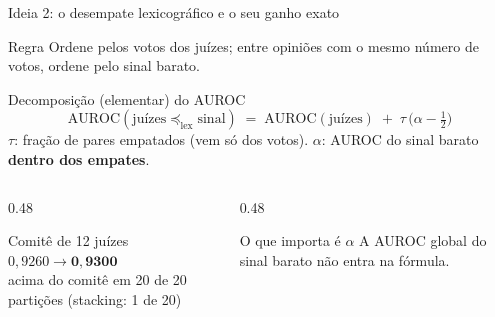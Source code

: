 \documentclass[aspectratio=169,11pt]{beamer}
\newcommand{\AUC}{\mathrm{AUROC}}
\newcommand{\lex}{\preceq_{\mathrm{lex}}}
\begin{document}
\begin{frame}{Ideia 2: o desempate lexicográfico e o seu ganho exato}
  \begin{block}{Regra}
    Ordene pelos votos dos juízes; entre opiniões com o mesmo número de votos, ordene pelo sinal barato.
  \end{block}
  \vspace{0.2cm}
  \begin{exampleblock}{Decomposição (elementar) do AUROC}
    $$\AUC(\text{juízes} \lex \text{sinal}) \;=\; \AUC(\text{juízes}) \;+\; \tau\,\Big(\alpha - \tfrac{1}{2}\Big)$$
    \small $\tau$: fração de pares empatados (vem só dos votos). \quad
    $\alpha$: AUROC do sinal barato \textbf{dentro dos empates}.
  \end{exampleblock}
  \vspace{0.2cm}
  \begin{columns}[T]
    \begin{column}{0.48\textwidth}
      \begin{block}{\centering Comitê de 12 juízes}\centering
        $0{,}9260 \to \mathbf{0{,}9300}$\\ \small acima do comitê em 20 de 20 partições (stacking: 1 de 20)
      \end{block}
    \end{column}
    \begin{column}{0.48\textwidth}
      \begin{block}{\centering O que importa é $\alpha$}\centering\small
        A AUROC global do sinal barato não entra na fórmula.
      \end{block}
    \end{column}
  \end{columns}
\end{frame}
\end{document}
